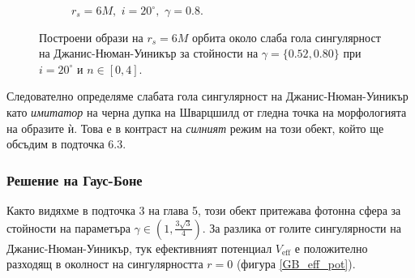\begin{figure}[!htb]
\begin{subfigure}{6cm}
		\caption{$r_s = 6M,\,\, i = 20^\circ,\,\,\gamma = 0.8$.}
	\end{subfigure}
	\caption[Построени образи на $r_s = 6M$ орбита около слаба гола сингулярност на Джанис-Нюман-Уиникър за различни стойности на $\gamma$ при $i = 20^\circ$.]{\small Построени образи на $r_s = 6M$ орбита около слаба гола сингулярност на Джанис-Нюман-Уиникър за стойности на $\gamma = \{0.52, 0.80\}$ при $i = 20^\circ$ и $n\in[0,4]$.} 
	\label{JNW_r6_20_deg}
\end{figure}

Следователно определяме слабата гола сингулярност на Джанис-Нюман-Уиникър като \emph{имитатор} на черна дупка на Шварцшилд от гледна точка на морфологията на образите ѝ. Това е в контраст на \emph{силният} режим на този обект, който ще обсъдим в подточка 6.3.

\subsubsection{Решение на Гаус-Боне} 
Както видяхме в подточка 3 на глава 5, този обект притежава фотонна сфера за стойности на параметъра $\gamma\in\left(1,\frac{3\sqrt{3}}{4}\right)$. За разлика от голите сингулярности на Джанис-Нюман-Уиникър, тук ефективният потенциал $V_\text{eff}$ е положително разходящ в околност на сингулярността $r = 0$ (фигура \ref{GB_eff_pot}).

